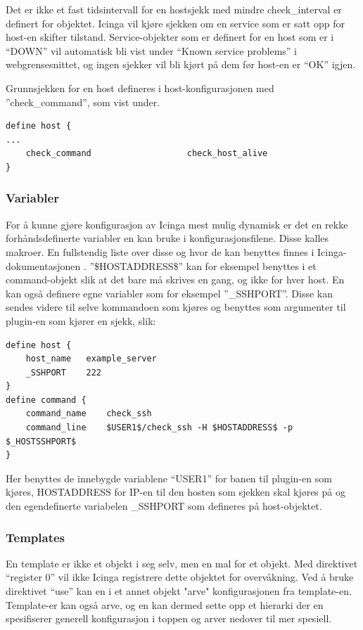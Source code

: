 Det er ikke et fast tidsintervall for en hostsjekk med mindre check\_interval er definert for objektet. Icinga vil kjøre sjekken om en service som er satt opp for host-en skifter tilstand. Service-objekter som er definert for en host som er i ``DOWN'' vil automatisk bli vist under ``Known service problems'' i webgrensesnittet, og ingen sjekker vil bli kjørt på dem før host-en er ``OK'' igjen.

Grunnsjekken for en host defineres i host-konfigurasjonen med ''check\_command'', som vist under.
\begin{lstlisting}[style=example]
define host {
...
    check_command                   check_host_alive
}
\end{lstlisting}

\subsubsection{Variabler}
For å kunne gjøre konfigurasjon av Icinga mest mulig dynamisk er det en rekke forhåndsdefinerte variabler en kan bruke i konfigurasjonsfilene. Disse kalles makroer. En fullstendig liste over disse og hvor de kan benyttes finnes i Icinga-dokumentasjonen \cite{icingamacro}. ''\$HOSTADDRESS\$'' kan for eksempel benyttes i et command-objekt slik at det bare må skrives en gang, og ikke for hver host. En kan også definere egne variabler som for eksempel ''\_SSHPORT''. Disse kan sendes videre til selve kommandoen som kjøres og benyttes som argumenter til plugin-en som kjører en sjekk, slik:
\begin{lstlisting}[style=example]
define host {
    host_name	example_server
    _SSHPORT	222
}
define command {
    command_name	check_ssh
    command_line	$USER1$/check_ssh -H $HOSTADDRESS$ -p $_HOSTSSHPORT$
}
\end{lstlisting}

Her benyttes de innebygde variablene ``USER1'' for banen til plugin-en som kjøres, HOSTADDRESS for IP-en til den hosten som sjekken skal kjøres på og den egendefinerte variabelen \_SSHPORT som defineres på host-objektet.


\subsubsection{Templates}
En template er ikke et objekt i seg selv, men en mal for et objekt. Med direktivet ``register 0'' vil ikke Icinga registrere dette objektet for overvåkning. Ved å bruke direktivet ``use'' kan en i et annet objekt "arve" konfigurasjonen fra template-en. Template-er kan også arve, og en kan dermed sette opp et hierarki der en spesifiserer generell konfigurasjon i toppen og arver nedover til mer spesiell. 

